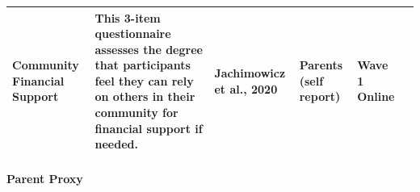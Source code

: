 \documentclass[]{book}
\let\oldparagraph\paragraph
\renewcommand{\paragraph}[1]{\oldparagraph{#1}\mbox{}}
\begin{document}
\begin{longtable}[]{@{}llllll@{}}
\begin{minipage}[t]{0.18\columnwidth}\raggedright
Community Financial Support\strut
\end{minipage} & \begin{minipage}[t]{0.18\columnwidth}\raggedright
This 3-item questionnaire assesses the degree that participants feel they can rely on others in their community for financial support if needed.\strut
\end{minipage} & \begin{minipage}[t]{0.15\columnwidth}\raggedright
Jachimowicz et al., 2020\strut
\end{minipage} & \begin{minipage}[t]{0.16\columnwidth}\raggedright
Parents (self report)\strut
\end{minipage} & \begin{minipage}[t]{0.06\columnwidth}\raggedright
Wave 1 Online\strut
\end{minipage} & \begin{minipage}[t]{0.10\columnwidth}\raggedright
\strut
\end{minipage}\tabularnewline
\bottomrule
\end{longtable}

\hypertarget{parent-proxy}{%
\paragraph{Parent Proxy}\label{parent-proxy}}
\end{document}
